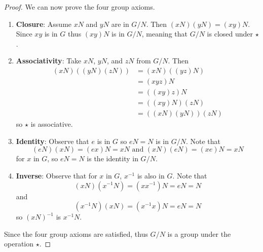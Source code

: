 \begin{proof}
    We can now prove the four group axioms.
    \begin{enumerate}
        \item \textbf{Closure}: Assume $xN$ and $yN$ are in $G/N$. Then $(xN)(yN) = (xy)N$. Since $xy$ is in $G$ thus $(xy)N$ is in $G/N$, meaning that $G/N$ is closed under $\star$.
        \item \textbf{Associativity}: Take $xN$, $yN$, and $zN$ from $G/N$. Then
        \begin{align*}
            (xN)\left((yN)(zN)\right) &= (xN)\left((yz)N\right)\\
            &= (xyz)N\\
            &= \left((xy)z\right)N\\
            &= \left((xy)N\right)(zN)\\
            &= \left((xN)(yN)\right)(zN)
        \end{align*}
        so $\star$ is associative.
        \item \textbf{Identity}: Observe that $e$ is in $G$ so $eN = N$ is in $G / N$. Note that
        \[
        (eN)(xN) = (ex)N = xN \text{ and } (xN)(eN) = (xe)N = xN
        \]
        for $x$ in $G$, so $eN = N$ is the identity in $G/N$.
        \item \textbf{Inverse}: Observe that for $x$ in $G$, $x^{-1}$ is also in $G$. Note that
        \[
        (xN)(x^{-1}N) = (xx^{-1})N = eN = N
        \]
        and
        \[
        (x^{-1}N)(xN) = (x^{-1}x)N = eN = N
        \]
        so $(xN)^{-1}$ is $x^{-1}N$.
    \end{enumerate}
    Since the four group axioms are satisfied, thus $G/N$ is a group under the operation $\star$.
\end{proof}

